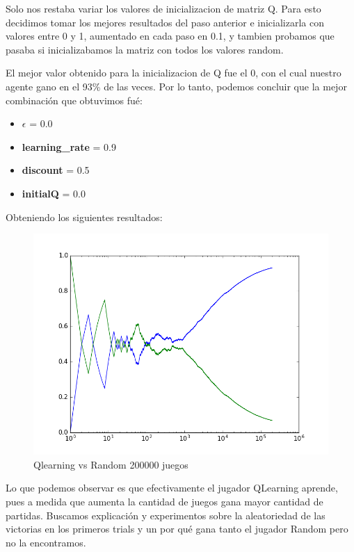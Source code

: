 Solo nos restaba variar los valores de inicializacion de matriz Q. Para esto decidimos tomar los mejores resultados del paso
 anterior e inicializarla con valores entre 0 y 1, aumentado en cada paso en 0.1, y tambien probamos que pasaba si
 inicializabamos la matriz con todos los valores random.

El mejor valor obtenido para la inicializacion de Q fue el 0, con el cual nuestro agente gano en el 93\% de las veces.
Por lo tanto, podemos concluir que la mejor combinación que obtuvimos fué:

\begin{itemize}
  \item  \textbf{$\epsilon$} = 0.0
  \item \textbf{learning\_rate} = 0.9
  \item \textbf{discount} = 0.5
  \item \textbf{initialQ} = 0.0
\end{itemize}

Obteniendo los siguientes resultados:

\begin{figure}[h]
 \centering
  \begin{minipage}[c]{1\textwidth}
	\centering
	\includegraphics[scale=0.5]{img/QlearningRandomEgreedy200000.png}
        \caption{Qlearning vs Random 200000 juegos}
  \end{minipage}
\end{figure}

Lo que podemos observar es que efectivamente el jugador QLearning aprende, pues a medida que aumenta la cantidad de juegos gana mayor cantidad de partidas. Buscamos explicaci\'on y experimentos sobre la aleatoriedad de las victorias en los primeros trials y un por qu\'e gana tanto el jugador Random pero no la encontramos.

